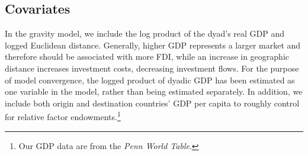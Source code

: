\documentclass[reqno,onecolumn,letterpaper,12pt]{article}
\begin{document}





\subsection{Covariates}

In the gravity model, we include the log product of the dyad's real GDP and logged Euclidean distance. Generally, higher GDP represents a larger market and therefore should be associated with more FDI, while an increase in geographic distance increases investment costs, decreasing investment flows. For the purpose of model convergence, the logged product of dyadic GDP has been estimated as one variable in the model, rather than being estimated separately. In addition, we include both origin and destination countries' GDP per capita to roughly control for relative factor endowments.\footnote{Our GDP data are from the \textit{Penn World Table}.}
\end{document}
